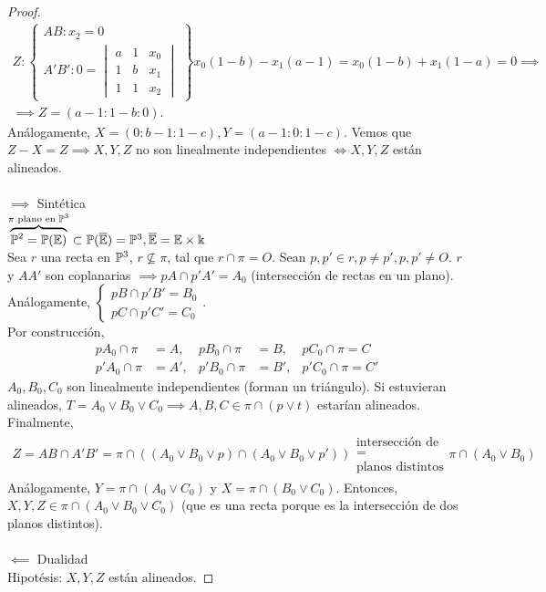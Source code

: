 \begin{proof}
\begin{gather*}
Z : \left. \begin{cases}
AB : x_2 = 0 \\
A'B' : 0 = \begin{vmatrix} a & 1 & x_0 \\ 1 & b & x_1 \\ 1 & 1 & x_2 \end{vmatrix}
\end{cases} \right\}
x_0(1-b)-x_1(a-1)=x_0(1-b) + x_1(1-a) = 0 \implies \\ \implies Z = (a-1:1-b:0).
\end{gather*}
Análogamente, $X = (0:b-1:1-c), Y = (a-1:0:1-c)$. Vemos que $Z-X = Z \implies X,Y,Z$ no son linealmente independientes $\iff X,Y,Z$
están alineados. \\ \\
$\implies$ Sintética \\
$\overbrace{\mathbb{P}^2 = \mathbb{P}(\mathbb{E})}^{\pi \text{ plano en } \mathbb{P}^3} \subset \mathbb{P}(\overline{\mathbb{E}}) = \mathbb{P}^3, \overline{\mathbb{E}} = \mathbb{E} \times \Bbbk$ \\
Sea $r$ una recta en $\mathbb{P}^3$, $r \nsubseteq \pi$, tal que $r \cap \pi = O$. Sean $p,p' \in r, p\neq p', p, p' \neq O$.
$r$ y $AA'$ son coplanarias $\implies pA \cap p'A' = A_0$ (intersección de rectas en un plano). Análogamente,
$\begin{cases} pB \cap p'B' = B_0 \\ pC \cap p'C' = C_0 \end{cases}$. \\
Por construcción,
\begin{align*}
    pA_0 \cap \pi &= A, & pB_0 \cap \pi &= B, & pC_0 \cap \pi = C \\
    p'A_0 \cap \pi &= A', & p'B_0 \cap \pi &= B', & p'C_0 \cap \pi = C'
\end{align*}
$A_0, B_0, C_0$ son linealmente independientes (forman un triángulo). Si estuvieran alineados, $T = A_0 \vee B_0 \vee C_0 \implies A,B,C \in
\pi \cap (p \vee t)$ estarían alineados.\\
Finalmente,
\begin{gather*}
    Z = AB \cap A'B'= \pi \cap \left( \left( A_0 \vee B_0 \vee p \right) \cap \left( A_0 \vee B_0 \vee p' \right) \right)
    \substack{\text{intersección de} \\ = \\ \text{planos distintos}} \pi \cap \left( A_0 \vee B_0 \right)
\end{gather*}
Análogamente, $Y = \pi \cap \left( A_0 \vee C_0 \right)$ y $X = \pi \cap \left( B_0 \vee C_0 \right)$. Entonces, $X,Y,Z \in \pi\cap\left(
A_0 \vee B_0 \vee C_0 \right)$ (que es una recta porque es la intersección de dos planos distintos).
\\ \\
$\impliedby$ Dualidad \\
Hipotésis: $X, Y, Z$ están alineados.


\end{proof}
